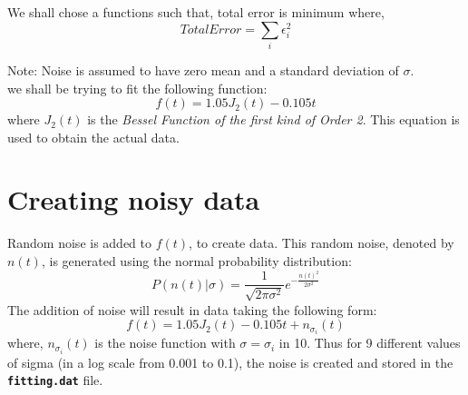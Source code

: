 \documentclass[11pt, a4paper]{article}
\begin{document}
        We shall chose a functions such that, total error is minimum where,
        \begin{equation}  Total Error = \sum_{i}\epsilon_i^2 \end{equation} 
        
        Note: Noise is assumed to have zero mean and a standard deviation of $\sigma$.\\
        
        we shall be trying to fit the following function:
        \begin{equation}
            f(t) = 1.05J_2(t)-0.105t
        \end{equation}
        where $J_2(t)$ is the \textit{Bessel Function of the first kind of Order 2}. This equation is used to obtain the actual data.
        
        \section{Creating noisy data}
            Random noise is added to $f(t)$, to create data. This random noise, denoted by $n(t)$, is generated using the normal probability distribution:
            \begin{equation}
                P(n(t)|\sigma)=\frac{1}{\sqrt{2\pi\sigma^2}}e^{-\frac{n(t)^2}{2\sigma^2}} \label{eq1}
            \end{equation}
            The addition of noise will result in data taking the following form:
            \begin{equation}
                f(t) = 1.05J_2(t)-0.105t+n_{\sigma_i}(t)
            \end{equation}
            where, $n_{\sigma_i}(t)$ is the noise function with $\sigma = \sigma_{i}$ in 10. Thus for 9 different values of sigma (in a log scale from 0.001 to 0.1), the noise is created and stored in the \texttt{\textbf{fitting.dat}} file.
            
\end{document}
